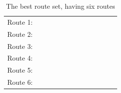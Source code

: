 
    \begin{table}[H]
    \centering
    \begin{tabular}{|l|l l l l l l l l|}
    \hline
    Route 1: & ~ & ~ & ~ & ~ & ~ & ~ & ~ & ~ \\
    Route 2: & ~ & ~ & ~ & ~ & ~ & ~ & ~ & ~ \\
    Route 3: & ~ & ~ & ~ & ~ & ~ & ~ & ~ & ~ \\
    Route 4: & ~ & ~ & ~ & ~ & ~ & ~ & ~ & ~ \\
    Route 5: & ~ & ~ & ~ & ~ & ~ & ~ & ~ & ~ \\
    Route 6: & ~ & ~ & ~ & ~ & ~ & ~ & ~ & ~ \\
    \hline
    \end{tabular}
    \caption {The best route set, having six routes}
    \label{table:performanceComparison_bestRouteSet6}
    \end{table}

